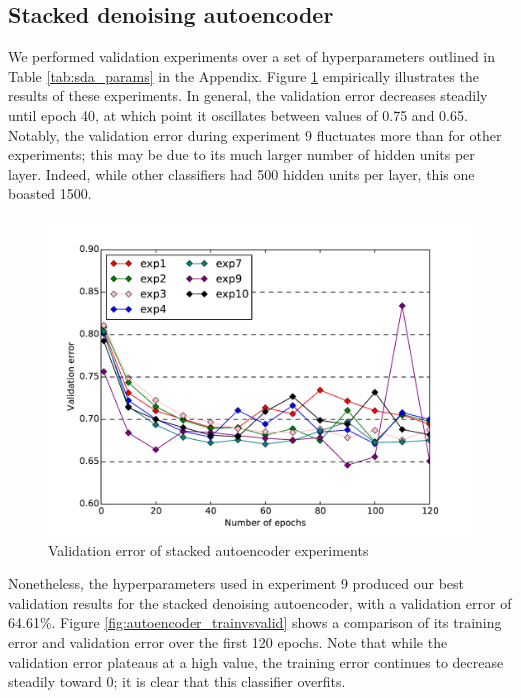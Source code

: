 \documentclass{acm_proc_article-sp}
\begin{document}
\subsection{Stacked denoising autoencoder}

We performed validation experiments over a set of hyperparameters outlined in Table \ref{tab:sda_params} in the Appendix. Figure \ref{fig:autoencoder_compare} empirically illustrates the results of these experiments. In general, the validation error decreases steadily until epoch 40, at which point it oscillates between values of 0.75 and 0.65. Notably, the validation error during experiment 9 fluctuates more than for other experiments; this may be due to its much larger number of hidden units per layer. Indeed, while other classifiers had 500 hidden units per layer, this one boasted 1500. 

\begin{figure}[h!]
\includegraphics[width=\linewidth]{autoencoder_compare.pdf}
		\caption{Validation error of stacked autoencoder experiments}
		\label{fig:autoencoder_compare}
\end{figure}

Nonetheless, the hyperparameters used in experiment 9 produced our best validation results for the stacked denoising autoencoder, with a validation error of 64.61\%. Figure \ref{fig:autoencoder_trainvsvalid} shows a comparison of its training error and validation error over the first 120 epochs. Note that while the validation error plateaus at a high value, the training error continues to decrease steadily toward 0; it is clear that this classifier overfits.
\end{document}

